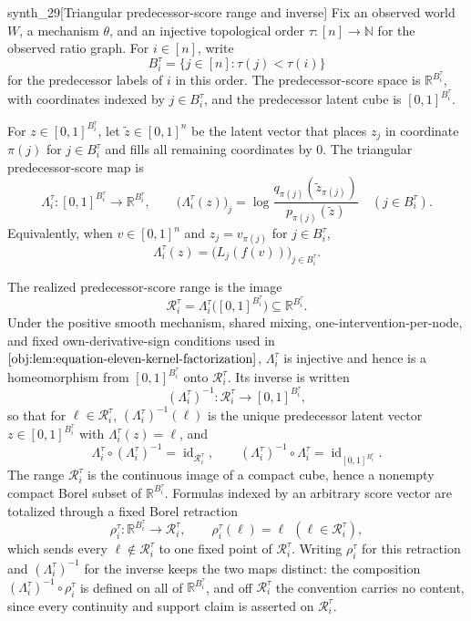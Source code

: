 \documentclass[11pt]{article}
\begin{document}
\begin{definitionv}{synth_29}[Triangular predecessor-score range and inverse]
Fix an observed world \(W\), a mechanism \(\theta\), and an injective topological order \(\tau:[n]\to\mathbb N\) for the observed ratio graph. For \(i\in[n]\), write
\[
B_i^\tau=\{j\in[n]:\tau(j)<\tau(i)\}
\]
for the predecessor labels of \(i\) in this order. The predecessor-score space is \(\mathbb R^{B_i^\tau}\), with coordinates indexed by \(j\in B_i^\tau\), and the predecessor latent cube is \([0,1]^{B_i^\tau}\).

For \(z\in[0,1]^{B_i^\tau}\), let \(\tilde z\in[0,1]^n\) be the latent vector that places \(z_j\) in coordinate \(\pi(j)\) for \(j\in B_i^\tau\) and fills all remaining coordinates by \(0\). The triangular predecessor-score map is
\[
\Lambda_i^\tau:[0,1]^{B_i^\tau}\longrightarrow \mathbb R^{B_i^\tau},
\qquad
\bigl(\Lambda_i^\tau(z)\bigr)_j
=
\log\frac{q_{\pi(j)}(\tilde z_{\pi(j)})}{p_{\pi(j)}(\tilde z)}
\quad (j\in B_i^\tau).
\]
Equivalently, when \(v\in[0,1]^n\) and \(z_j=v_{\pi(j)}\) for \(j\in B_i^\tau\),
\[
\Lambda_i^\tau(z)
=
\bigl(L_j(f(v))\bigr)_{j\in B_i^\tau}.
\]

The realized predecessor-score range is the image
\[
\mathcal R_i^\tau=\Lambda_i^\tau\bigl([0,1]^{B_i^\tau}\bigr)\subseteq \mathbb R^{B_i^\tau}.
\]
Under the positive smooth mechanism, shared mixing, one-intervention-per-node, and fixed own-derivative-sign conditions used in \(\cref{obj:lem:equation-eleven-kernel-factorization}\), \(\Lambda_i^\tau\) is injective and hence is a homeomorphism from \([0,1]^{B_i^\tau}\) onto \(\mathcal R_i^\tau\). Its inverse is written
\[
(\Lambda_i^\tau)^{-1}:\mathcal R_i^\tau\longrightarrow[0,1]^{B_i^\tau},
\]
so that for \(\ell\in\mathcal R_i^\tau\), \((\Lambda_i^\tau)^{-1}(\ell)\) is the unique predecessor latent vector \(z\in[0,1]^{B_i^\tau}\) with \(\Lambda_i^\tau(z)=\ell\), and
\[
\Lambda_i^\tau\circ(\Lambda_i^\tau)^{-1}=\operatorname{id}_{\mathcal R_i^\tau},
\qquad
(\Lambda_i^\tau)^{-1}\circ\Lambda_i^\tau=\operatorname{id}_{[0,1]^{B_i^\tau}}.
\]
The range \(\mathcal R_i^\tau\) is the continuous image of a compact cube, hence a nonempty compact Borel subset of \(\mathbb R^{B_i^\tau}\). Formulas indexed by an arbitrary score vector are totalized through a fixed Borel retraction
\[
\rho_i^\tau:\mathbb R^{B_i^\tau}\longrightarrow\mathcal R_i^\tau,
\qquad
\rho_i^\tau(\ell)=\ell\ \ (\ell\in\mathcal R_i^\tau),
\]
which sends every \(\ell\notin\mathcal R_i^\tau\) to one fixed point of \(\mathcal R_i^\tau\). Writing \(\rho_i^\tau\) for this retraction and \((\Lambda_i^\tau)^{-1}\) for the inverse keeps the two maps distinct: the composition \((\Lambda_i^\tau)^{-1}\circ\rho_i^\tau\) is defined on all of \(\mathbb R^{B_i^\tau}\), and off \(\mathcal R_i^\tau\) the convention carries no content, since every continuity and support claim is asserted on \(\mathcal R_i^\tau\).
\end{definitionv}
\end{document}
